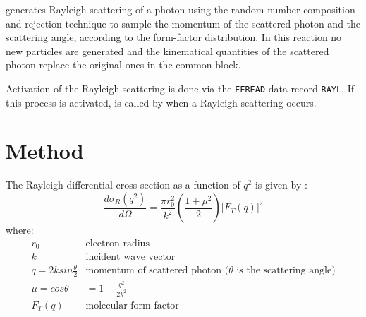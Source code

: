  
 generates Rayleigh scattering of a photon using 
the random-number
composition and rejection technique to sample the momentum
of the scattered photon and the scattering angle, according to the
form-factor distribution. In this reaction no new particles are
generated and the kinematical quantities of the scattered photon
replace the original ones in the  common block.
 
Activation of the Rayleigh scattering is done via the {\tt FFREAD} data
record {\tt RAYL}. If this process is activated,  is called
by  when a Rayleigh scattering occurs.
\section{ Method }
 
The Rayleigh differential cross section as a function of $ q^2 $ is given
by \cite{bib-NELS}:
\begin{equation}
\frac{d \sigma_R \left( q^2 \right) }{ d \Omega } =
 \frac{ \pi r_0^2}{ k^2 } \left( \frac{1 + \mu^2 }{ 2 } \right)
 \left| F_T \left( q \right) \right| ^2
\end{equation}
where:\\
 
\[\begin{array}{LL}
r_0       & \mbox{electron radius} \\
k         & \mbox{incident wave vector} \\
q=2k sin \frac{ \theta }{2}  & \mbox{momentum of scattered
              photon ($\theta$ is the scattering angle)} \\
\mu = cos \theta  & = 1 - \frac{q^2 }{ 2 k^2} \\
F_T \left( q \right)     & \mbox{molecular form factor}
\end{array} \]
 
